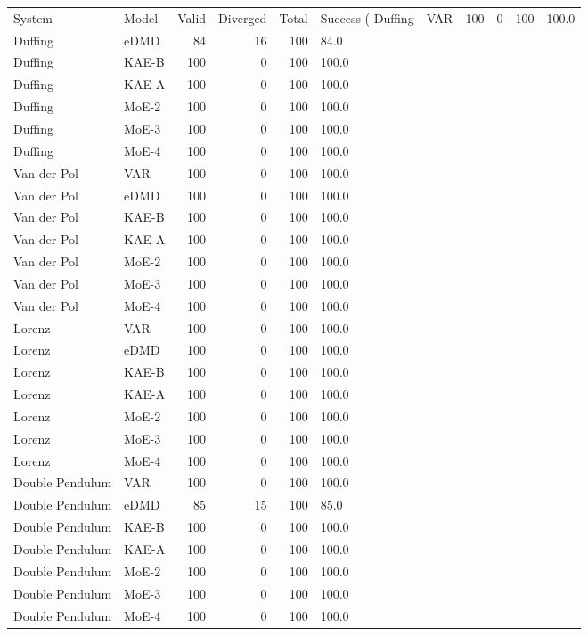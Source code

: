 \begin{tabular}{llrrrl}
\toprule
System & Model & Valid & Diverged & Total & Success (%
\midrule
Duffing & VAR & 100 & 0 & 100 & 100.0 \\
Duffing & eDMD & 84 & 16 & 100 & 84.0 \\
Duffing & KAE-B & 100 & 0 & 100 & 100.0 \\
Duffing & KAE-A & 100 & 0 & 100 & 100.0 \\
Duffing & MoE-2 & 100 & 0 & 100 & 100.0 \\
Duffing & MoE-3 & 100 & 0 & 100 & 100.0 \\
Duffing & MoE-4 & 100 & 0 & 100 & 100.0 \\
Van der Pol & VAR & 100 & 0 & 100 & 100.0 \\
Van der Pol & eDMD & 100 & 0 & 100 & 100.0 \\
Van der Pol & KAE-B & 100 & 0 & 100 & 100.0 \\
Van der Pol & KAE-A & 100 & 0 & 100 & 100.0 \\
Van der Pol & MoE-2 & 100 & 0 & 100 & 100.0 \\
Van der Pol & MoE-3 & 100 & 0 & 100 & 100.0 \\
Van der Pol & MoE-4 & 100 & 0 & 100 & 100.0 \\
Lorenz & VAR & 100 & 0 & 100 & 100.0 \\
Lorenz & eDMD & 100 & 0 & 100 & 100.0 \\
Lorenz & KAE-B & 100 & 0 & 100 & 100.0 \\
Lorenz & KAE-A & 100 & 0 & 100 & 100.0 \\
Lorenz & MoE-2 & 100 & 0 & 100 & 100.0 \\
Lorenz & MoE-3 & 100 & 0 & 100 & 100.0 \\
Lorenz & MoE-4 & 100 & 0 & 100 & 100.0 \\
Double Pendulum & VAR & 100 & 0 & 100 & 100.0 \\
Double Pendulum & eDMD & 85 & 15 & 100 & 85.0 \\
Double Pendulum & KAE-B & 100 & 0 & 100 & 100.0 \\
Double Pendulum & KAE-A & 100 & 0 & 100 & 100.0 \\
Double Pendulum & MoE-2 & 100 & 0 & 100 & 100.0 \\
Double Pendulum & MoE-3 & 100 & 0 & 100 & 100.0 \\
Double Pendulum & MoE-4 & 100 & 0 & 100 & 100.0 \\
\bottomrule
\end{tabular}
